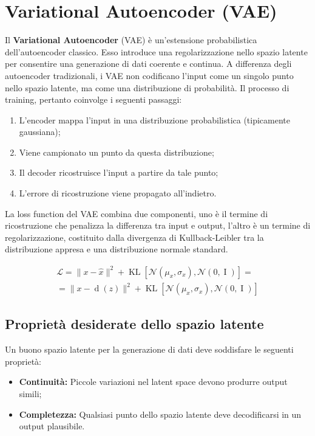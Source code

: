 \section{Variational Autoencoder (VAE)}

Il \textbf{Variational Autoencoder} (VAE) è un’estensione probabilistica dell’autoencoder classico. Esso introduce una regolarizzazione nello spazio latente per consentire una generazione di dati coerente e continua. A differenza degli autoencoder tradizionali, i VAE non codificano l’input come un singolo punto nello spazio latente, ma come una distribuzione di probabilità. Il processo di training, pertanto coinvolge i seguenti passaggi:

\begin{enumerate}
    \item L’encoder mappa l’input in una distribuzione probabilistica (tipicamente gaussiana);
    \item Viene campionato un punto da questa distribuzione;
    \item Il decoder ricostruisce l’input a partire da tale punto;
    \item L’errore di ricostruzione viene propagato all’indietro.
\end{enumerate}

La loss function del VAE combina due componenti, uno è il termine di ricostruzione che penalizza la differenza tra input e output, l'altro è un termine di regolarizzazione, costituito dalla divergenza di Kullback-Leibler tra la distribuzione appresa e una distribuzione normale standard.

\begin{equation}
    \begin{split}
    \mathcal{L} = \| x - \hat{x}\|^2 + \operatorname{KL}[\mathcal{N}(\mu_x,\sigma_x), \mathcal{N}(0,\operatorname{I})] =\\= \|x-\operatorname{d}(z)\|^2 + \operatorname{KL}[\mathcal{N}(\mu_x,\sigma_x), \mathcal{N}(0, \operatorname{I})]
    \end{split}
\end{equation}

\subsection{Proprietà desiderate dello spazio latente}

Un buono spazio latente per la generazione di dati deve soddisfare le seguenti proprietà:

\begin{itemize}
    \item \textbf{Continuità:} Piccole variazioni nel latent space devono produrre output simili;
    \item \textbf{Completezza:} Qualsiasi punto dello spazio latente deve decodificarsi in un output plausibile.
\end{itemize}

